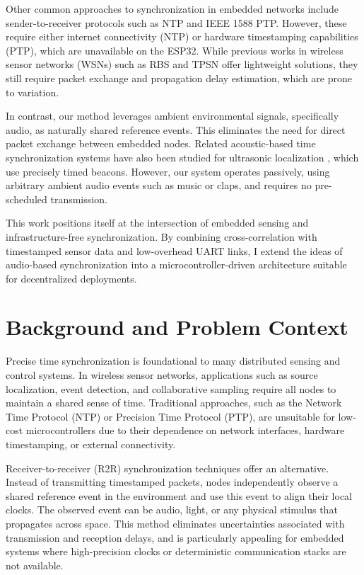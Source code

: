 \documentclass[sigconf]{acmart}
\begin{document}
Other common approaches to synchronization in embedded networks include sender-to-receiver protocols such as NTP and IEEE 1588 PTP. However, these require either internet connectivity (NTP) or hardware timestamping capabilities (PTP), which are unavailable on the ESP32. While previous works in wireless sensor networks (WSNs) such as RBS \cite{elson2002fine} and TPSN \cite{ganeriwal2003timing} offer lightweight solutions, they still require packet exchange and propagation delay estimation, which are prone to variation.

In contrast, our method leverages ambient environmental signals, specifically audio, as naturally shared reference events. This eliminates the need for direct packet exchange between embedded nodes. Related acoustic-based time synchronization systems have also been studied for ultrasonic localization \cite{lazik2015ultrasonic}, which use precisely timed beacons. However, our system operates passively, using arbitrary ambient audio events such as music or claps, and requires no pre-scheduled transmission.

This work positions itself at the intersection of embedded sensing and infrastructure-free synchronization. By combining cross-correlation with timestamped sensor data and low-overhead UART links, I extend the ideas of audio-based synchronization into a microcontroller-driven architecture suitable for decentralized deployments.

\section{Background and Problem Context}

Precise time synchronization is foundational to many distributed sensing and control systems. In wireless sensor networks, applications such as source localization, event detection, and collaborative sampling require all nodes to maintain a shared sense of time. Traditional approaches, such as the Network Time Protocol (NTP) or Precision Time Protocol (PTP), are unsuitable for low-cost microcontrollers due to their dependence on network interfaces, hardware timestamping, or external connectivity.

Receiver-to-receiver (R2R) synchronization techniques offer an alternative. Instead of transmitting timestamped packets, nodes independently observe a shared reference event in the environment and use this event to align their local clocks. The observed event can be audio, light, or any physical stimulus that propagates across space. This method eliminates uncertainties associated with transmission and reception delays, and is particularly appealing for embedded systems where high-precision clocks or deterministic communication stacks are not available.
\end{document}
